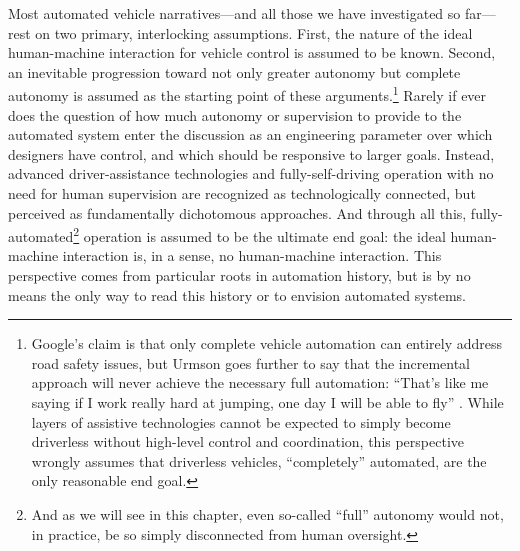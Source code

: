 Most automated vehicle narratives---and all those we have investigated
so far---rest on two primary, interlocking assumptions. First, the nature of the
ideal human-machine interaction for vehicle control is assumed to be
known. Second, an inevitable progression toward not only greater
autonomy but complete autonomy is assumed as the
starting point of these arguments.\footnote{Google's claim is that only complete
vehicle automation can entirely address road safety issues, but Urmson
goes further to say that the incremental approach will 
never achieve the necessary full automation: ``That's like me saying
if I work really hard at jumping, one day I will be able to fly''
\cite{friedGoogle}.
While layers of assistive technologies cannot be expected to simply become
driverless without high-level control and coordination, this perspective wrongly
assumes that driverless vehicles, ``completely'' automated, are the
only reasonable end goal.} Rarely if ever does the question of
how much autonomy or supervision to provide to the automated system
enter the discussion as an engineering parameter over which designers
have control, and which should be responsive to larger goals. Instead,
advanced driver-assistance technologies and fully-self-driving
operation with no need for human supervision are recognized as
technologically connected, but perceived as fundamentally dichotomous
approaches. And through all this,
fully-automated\footnote{And as we will see in this chapter, even
  so-called ``full'' autonomy would not, in practice, be so simply
  disconnected from human oversight.} operation is assumed to be the
ultimate end goal: the ideal human-machine
interaction is, in a sense, no human-machine interaction. This
perspective comes from particular roots in automation history, but is
by no means the only way to read this history or to envision automated
systems. 






